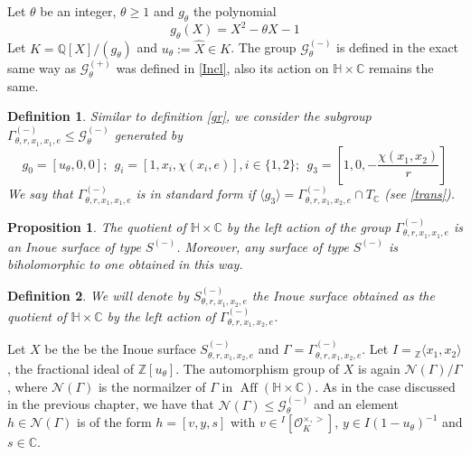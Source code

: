 \documentclass[12pt]{amsart}
\newtheorem{definition}{Definition}[section]
\newtheorem{proposition}{Proposition}[section]
\newcommand{\Z}{\mathbb{Z}}
\newcommand{\C}{\mathbb{C}}
\newcommand{\Q}{\mathbb{Q}}
\newcommand{\HH}{\mathbb{H}}
\newcommand{\OO}{\mathcal{O}}
\DeclareMathOperator{\Aff}{Aff}
\begin{document}
Let $\theta$ be an integer, $\theta \geq 1$ and $g_\theta$ the polynomial 
$$g_{\theta}(X)=X^2 - \theta X - 1$$
Let $K = \Q[X]/(g_\theta)$ and $u_\theta:= \hat{X} \in K$. The group $\mathcal{G}^{(-)}_\theta$ is defined in the exact same way as $\mathcal{G}_{\theta}^{(+)}$ was defined in \ref{Incl}, also its action on $\HH \times \C$ remains the same. 
\begin{definition}
Similar to definition \ref{gr}, we consider the subgroup $\Gamma^{(-)}_{\theta,r,x_1,x_1,e} \leq \mathcal{G}^{(-)}_\theta$ generated by
$$g_0=[u_\theta,0,0];\ \ g_i=[1,x_i,\chi(x_i, e)], i \in \{1,2\};\ \ g_3=\left[1,0,-\frac{\chi(x_1,x_2)}{r}\right]$$
We say that $\Gamma^{(-)}_{\theta,r,x_1,x_1,e}$ is in standard form if $\langle g_3 \rangle  = \Gamma_{\theta, r, x_1,x_2, e}^{(-)} \cap T_{\C}$ (see \ref{trans}).
\end{definition}

\begin{proposition}
The quotient of $\HH \times \C$ by the left action of the group $\Gamma^{(-)}_{\theta,r,x_1,x_1,e}$ is an Inoue surface of type $S^{(-)}$. Moreover, any surface of type $S^{(-)}$ is biholomorphic to one obtained in this way.
\end{proposition}

\begin{definition}
We will denote by $S^{(-)}_{\theta,r,x_1,x_2,e}$ the Inoue surface obtained as the quotient of $\HH \times \C$ by the left action of $\Gamma_{\theta,r,x_1,x_2,e}^{(-)}$.   
\end{definition}
\noindent
Let $X$ be the be the Inoue surface $S^{(-)}_{\theta,r,x_1,x_2,e}$ and $\Gamma = \Gamma^{(-)}_{\theta, r, x_1,x_2,e}$. Let $I= {}_\Z\langle x_1,x_2\rangle$, the fractional ideal of $\Z[u_\theta]$. The automorphism group of $X$ is again $\mathcal{N}(\Gamma)/\Gamma$, where $\mathcal{N}(\Gamma)$ is the normailzer of $\Gamma$ in $\Aff(\HH \times \C)$. As in the case discussed in the previous chapter, we have that $\mathcal{N}(\Gamma) \leq \mathcal{G}_{\theta}^{(-)}$ and an element $h \in \mathcal{N}(\Gamma)$ is of the form $h= [v,y,s]$ with $v \in {}^I[\OO_K^{\times,>}]$, $y\in I(1-u_\theta)^{-1}$ and $s\in \C$.
\end{document}
